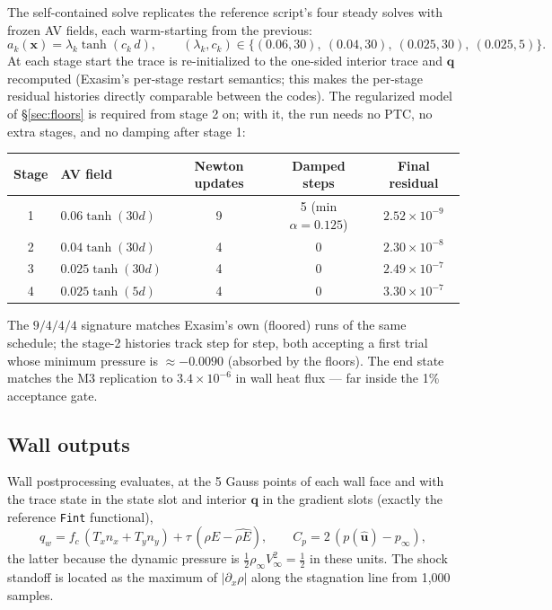 \documentclass[11pt]{article}
\newcommand{\bq}{\mathbf{q}}
\newcommand{\buh}{\widehat{\mathbf{u}}}
\newcommand{\bx}{\mathbf{x}}
\newcommand{\code}[1]{\texttt{#1}}
\begin{document}
The self-contained solve replicates the reference script's four steady
solves with frozen AV fields, each warm-starting from the previous:
\begin{equation}
a_k(\bx) = \lambda_k \tanh(c_k\, d),\qquad
(\lambda_k, c_k) \in \bigl\{(0.06, 30),\ (0.04, 30),\
(0.025, 30),\ (0.025, 5)\bigr\}.
\end{equation}
At each stage start the trace is re-initialized to the one-sided interior
trace and $\bq$ recomputed (Exasim's per-stage restart semantics; this makes
the per-stage residual histories directly comparable between the codes). The
regularized model of \S\ref{sec:floors} is required from stage 2 on; with it,
the run needs no PTC, no extra stages, and no damping after stage 1:
\begin{center}
\begin{tabular}{clccc}
\toprule
Stage & AV field & Newton updates & Damped steps & Final residual\\
\midrule
1 & $0.06\tanh(30 d)$ & 9 & 5 (min $\alpha = 0.125$) & $2.52\times10^{-9}$\\
2 & $0.04\tanh(30 d)$ & 4 & 0 & $2.30\times10^{-8}$\\
3 & $0.025\tanh(30 d)$ & 4 & 0 & $2.49\times10^{-7}$\\
4 & $0.025\tanh(5 d)$ & 4 & 0 & $3.30\times10^{-7}$\\
\bottomrule
\end{tabular}
\end{center}
The $9/4/4/4$ signature matches Exasim's own (floored) runs of the same
schedule; the stage-2 histories track step for step, both accepting a first
trial whose minimum pressure is $\approx -0.0090$ (absorbed by the floors).
The end state matches the M3 replication to $3.4\times10^{-6}$ in wall heat
flux --- far inside the 1\% acceptance gate.

\subsection{Wall outputs}

Wall postprocessing evaluates, at the 5 Gauss points of each wall face and
with the trace state in the state slot and interior $\bq$ in the gradient
slots (exactly the reference \code{Fint} functional),
\begin{equation}
q_w = f_c\,(T_x n_x + T_y n_y) + \tau\,(\rho E - \widehat{\rho E}),
\qquad
C_p = 2\,(p(\buh) - p_\infty),
\end{equation}
the latter because the dynamic pressure is
$\tfrac12\rho_\infty V_\infty^2 = \tfrac12$ in these units. The shock
standoff is located as the maximum of $|\partial_x \rho|$ along the
stagnation line from 1{,}000 samples.
\end{document}
